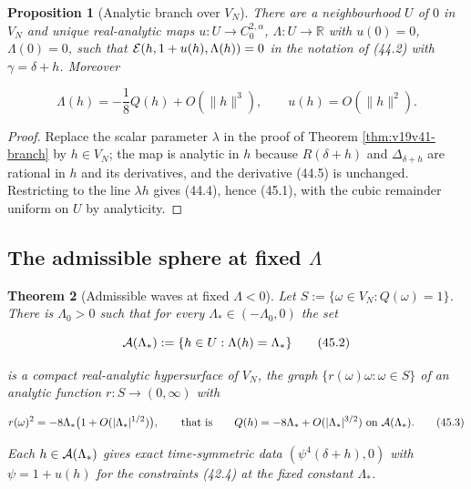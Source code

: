 \documentclass[11pt]{article}
\newtheorem{theorem}{Theorem}[section]
\newtheorem{proposition}[theorem]{Proposition}
\theoremstyle{remark}
\begin{document}
\begin{proposition}[Analytic branch over \(V_N\)]
\label{prop:v19v42-analytic}
There are a neighbourhood \(U\) of \(0\) in \(V_N\) and unique
real-analytic maps \(u:U\to C^{2,\alpha}_0\), \(\Lambda:U\to\mathbb R\)
with \(u(0)=0\), \(\Lambda(0)=0\), such that
\({\cal E}(h,1+u(h),\Lambda(h))=0\) in the notation of (44.2) with
\(\gamma=\delta+h\).  Moreover

\[
 \Lambda(h)=-\frac18Q(h)+O(\|h\|^3),\qquad u(h)=O(\|h\|^2).          \tag{45.1}
\]
\end{proposition}

\begin{proof}
Replace the scalar parameter \(\lambda\) in the proof of Theorem
\ref{thm:v19v41-branch} by \(h\in V_N\); the map is analytic in \(h\)
because \(R(\delta+h)\) and \(\Delta_{\delta+h}\) are rational in
\(h\) and its derivatives, and the derivative (44.5) is unchanged.
Restricting to the line \(\lambda h\) gives (44.4), hence (45.1), with
the cubic remainder uniform on \(U\) by analyticity.
\end{proof}

\subsection{The admissible sphere at fixed \(\Lambda\)}

\begin{theorem}[Admissible waves at fixed \(\Lambda<0\)]
\label{thm:v19v42-sphere}
Let \(S:=\{\omega\in V_N:Q(\omega)=1\}\).  There is \(\Lambda_0>0\) such
that for every \(\Lambda_*\in(-\Lambda_0,0)\) the set

\[
 {\cal A}(\Lambda_*):=\{h\in U:\Lambda(h)=\Lambda_*\}                  \tag{45.2}
\]

is a compact real-analytic hypersurface of \(V_N\), the graph
\(\{r(\omega)\omega:\omega\in S\}\) of an analytic function
\(r:S\to(0,\infty)\) with

\[
 r(\omega)^2=-8\Lambda_*\bigl(1+O(|\Lambda_*|^{1/2})\bigr),
 \qquad\hbox{that is}\qquad
 Q(h)=-8\Lambda_*+O(|\Lambda_*|^{3/2})\ \hbox{on }{\cal A}(\Lambda_*).  \tag{45.3}
\]

Each \(h\in{\cal A}(\Lambda_*)\) gives exact time-symmetric data
\((\psi^4(\delta+h),0)\) with \(\psi=1+u(h)\) for the constraints
(42.4) at the fixed constant \(\Lambda_*\).
\end{theorem}
\end{document}
